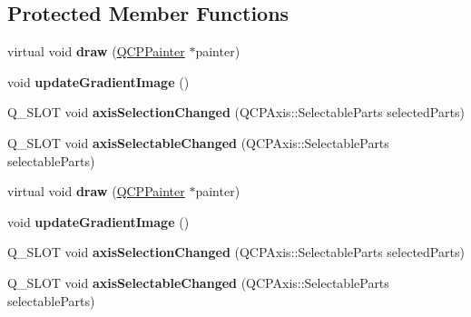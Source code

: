 \subsection*{Protected Member Functions}
\begin{DoxyCompactItemize}
\item 
\mbox{\label{class_q_c_p_color_scale_axis_rect_private_adb67bfe9057a9dd9a85f548c274e6d98}} 
virtual void {\bfseries draw} (\hyperlink{class_q_c_p_painter}{Q\+C\+P\+Painter} $\ast$painter)
\item 
\mbox{\label{class_q_c_p_color_scale_axis_rect_private_a73754cab312aeaddea1bfcc67cc079ac}} 
void {\bfseries update\+Gradient\+Image} ()
\item 
\mbox{\label{class_q_c_p_color_scale_axis_rect_private_a6112ad4291ac1695d37659cb049d598d}} 
Q\+\_\+\+S\+L\+OT void {\bfseries axis\+Selection\+Changed} (Q\+C\+P\+Axis\+::\+Selectable\+Parts selected\+Parts)
\item 
\mbox{\label{class_q_c_p_color_scale_axis_rect_private_a66d2baed86966bb03a6d7c32dc7d59f7}} 
Q\+\_\+\+S\+L\+OT void {\bfseries axis\+Selectable\+Changed} (Q\+C\+P\+Axis\+::\+Selectable\+Parts selectable\+Parts)
\item 
\mbox{\label{class_q_c_p_color_scale_axis_rect_private_a2b3398390737fe909801193e9c68758d}} 
virtual void {\bfseries draw} (\hyperlink{class_q_c_p_painter}{Q\+C\+P\+Painter} $\ast$painter)
\item 
\mbox{\label{class_q_c_p_color_scale_axis_rect_private_a73754cab312aeaddea1bfcc67cc079ac}} 
void {\bfseries update\+Gradient\+Image} ()
\item 
\mbox{\label{class_q_c_p_color_scale_axis_rect_private_a469323e7153a8a2801a55f297d13daa1}} 
Q\+\_\+\+S\+L\+OT void {\bfseries axis\+Selection\+Changed} (Q\+C\+P\+Axis\+::\+Selectable\+Parts selected\+Parts)
\item 
\mbox{\label{class_q_c_p_color_scale_axis_rect_private_a9401142640e19608130dfe63a6846b11}} 
Q\+\_\+\+S\+L\+OT void {\bfseries axis\+Selectable\+Changed} (Q\+C\+P\+Axis\+::\+Selectable\+Parts selectable\+Parts)
\end{DoxyCompactItemize}

